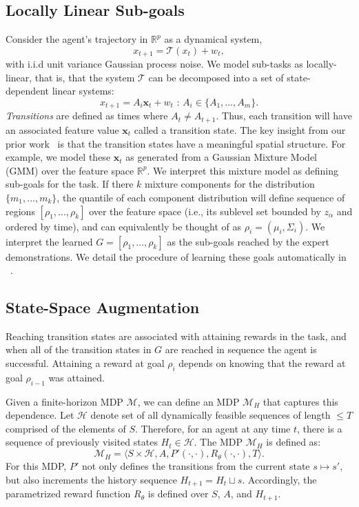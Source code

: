 \documentclass[letterpaper, 10 pt, conference]{ieeeconf}
\begin{document}
\subsection{Locally Linear Sub-goals}
Consider the agent's trajectory in $\mathbb{R}^p$ as a dynamical system,
\[
x_{t+1} = \mathcal{T}(x_{t}) + w_{t},
\]
with i.i.d unit variance Gaussian process noise.
We model sub-tasks as locally-linear, that is, that the system $\mathcal{T}$ can be decomposed into a set of state-dependent linear systems:
\[
x_{t+1} = A_{i}\mathbf{x}_t + w_{t} \text{ : } A_i \in \{A_1,...,A_m\}.
\]
\emph{Transitions} are defined as times where $A_{t} \ne A_{t+1}$.
Thus, each transition will have an associated feature value $\mathbf{x}_{t}$ called a transition state.
The key insight from our prior work~\cite{krishnan2015tsc} is that the transition states have a meaningful spatial structure.
For example, we model these $\mathbf{x}_{t}$ as generated from a Gaussian Mixture Model (GMM) over the feature space $\mathbb{R}^p$. We interpret this mixture model as defining sub-goals for the task.
If there $k$ mixture components for the distribution $\{m_1,...,m_k\}$, the quantile of each component distribution will define sequence of regions $[\rho_1,...,\rho_k]$ over the feature space (i.e., its sublevel set bounded by $z_\alpha$ and ordered by time), and can equivalently be thought of as $\rho_i = (\mu_i,\Sigma_i)$.
We interpret the learned $G = [\rho_1,...,\rho_k]$ as the sub-goals reached by the expert demonstrations.
We detail the procedure of learning these goals automatically in ~\cite{krishnan2015tsc}.

\subsection{State-Space Augmentation}
Reaching transition states are associated with attaining rewards in the task, and when all of the transition states in $G$ are reached in sequence the agent is successful. 
Attaining a reward at goal $\rho_i$ depends on knowing that the reward at goal $\rho_{i-1}$ was attained.

Given a finite-horizon MDP $\mathcal{M}$, we can define an MDP $\mathcal{M}_H$ that captures this dependence.
Let $\mathcal{H}$ denote set of all dynamically feasible sequences of length $\le T$ comprised of the elements of $S$.
Therefore, for an agent at any time $t$, there is a sequence of previously visited states $H_t \in \mathcal{H}$.
The MDP $\mathcal{M}_H$ is defined as:
\[
\mathcal{M}_H = \langle S \times \mathcal{H},A,P'(\cdot,\cdot), R_\theta(\cdot,\cdot),T \rangle.
\]
For this MDP, $P'$ not only defines the transitions from the current state $s \mapsto s'$, but also increments the history sequence $H_{t+1} = H_{t} \sqcup s$.
Accordingly, the parametrized reward function $R_\theta$ is defined over $S$, $A$, and $H_{t+1}$.
\end{document}
